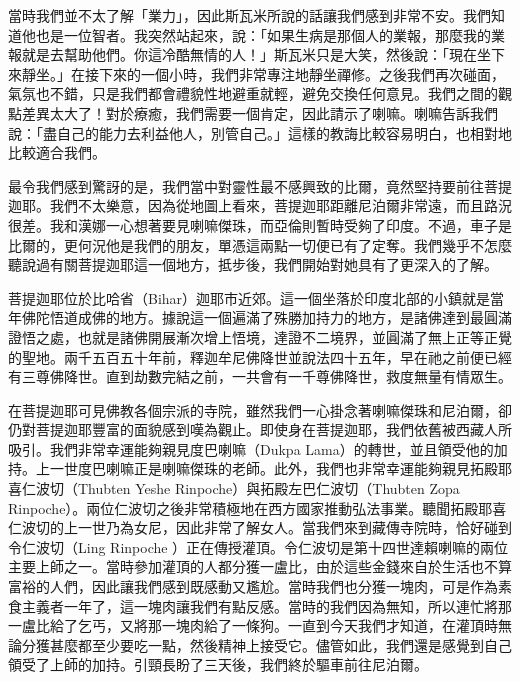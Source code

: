
當時我們並不太了解「業力」，因此斯瓦米所說的話讓我們感到非常不安。我們知道他也是一位智者。我突然站起來，說：「如果生病是那個人的業報，那麼我的業報就是去幫助他們。你這冷酷無情的人！」斯瓦米只是大笑，然後說：「現在坐下來靜坐。」在接下來的一個小時，我們非常專注地靜坐禪修。之後我們再次碰面，氣氛也不錯，只是我們都會禮貌性地避重就輕，避免交換任何意見。我們之間的觀點差異太大了！對於療癒，我們需要一個肯定，因此請示了喇嘛。喇嘛告訴我們說：「盡自己的能力去利益他人，別管自己。」這樣的教誨比較容易明白，也相對地比較適合我們。

最令我們感到驚訝的是，我們當中對靈性最不感興致的比爾，竟然堅持要前往菩提迦耶。我們不太樂意，因為從地圖上看來，菩提迦耶距離尼泊爾非常遠，而且路況很差。我和漢娜一心想著要見喇嘛傑珠，而亞倫則暫時受夠了印度。不過，車子是比爾的，更何況他是我們的朋友，單憑這兩點一切便已有了定奪。我們幾乎不怎麼聽說過有關菩提迦耶這一個地方，抵步後，我們開始對她具有了更深入的了解。

菩提迦耶位於比哈省（Bihar）迦耶市近郊。這一個坐落於印度北部的小鎮就是當年佛陀悟道成佛的地方。據說這一個遍滿了殊勝加持力的地方，是諸佛達到最圓滿證悟之處，也就是諸佛開展漸次增上悟境，達證不二境界，並圓滿了無上正等正覺的聖地。兩千五百五十年前，釋迦牟尼佛降世並說法四十五年，早在祂之前便已經有三尊佛降世。直到劫數完結之前，一共會有一千尊佛降世，救度無量有情眾生。

在菩提迦耶可見佛教各個宗派的寺院，雖然我們一心掛念著喇嘛傑珠和尼泊爾，卻仍對菩提迦耶豐富的面貌感到嘆為觀止。即使身在菩提迦耶，我們依舊被西藏人所吸引。我們非常幸運能夠親見度巴喇嘛（Dukpa
Lama）的轉世，並且領受他的加持。上一世度巴喇嘛正是喇嘛傑珠的老師。此外，我們也非常幸運能夠親見拓殿耶喜仁波切（Thubten
Yeshe Rinpoche）與拓殿左巴仁波切（Thubten Zopa
Rinpoche）。兩位仁波切之後非常積極地在西方國家推動弘法事業。聽聞拓殿耶喜仁波切的上一世乃為女尼，因此非常了解女人。當我們來到藏傳寺院時，恰好碰到令仁波切（Ling
Rinpoche
）正在傳授灌頂。令仁波切是第十四世達賴喇嘛的兩位主要上師之一。當時參加灌頂的人都分獲一盧比，由於這些金錢來自於生活也不算富裕的人們，因此讓我們感到既感動又尷尬。當時我們也分獲一塊肉，可是作為素食主義者一年了，這一塊肉讓我們有點反感。當時的我們因為無知，所以連忙將那一盧比給了乞丐，又將那一塊肉給了一條狗。一直到今天我們才知道，在灌頂時無論分獲甚麼都至少要吃一點，然後精神上接受它。儘管如此，我們還是感覺到自己領受了上師的加持。引頸長盼了三天後，我們終於驅車前往尼泊爾。


